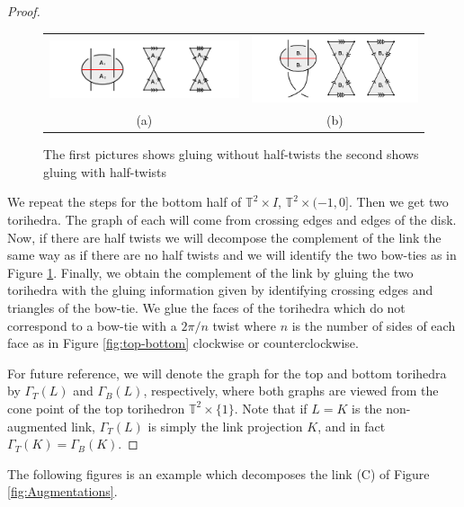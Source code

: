 \documentclass[11pt]{amsart}
\newcommand{\torus}{{\mathbb{T}^2}}
\theoremstyle{plain}
\theoremstyle{definition}
\begin{document}
\begin{proof}
\begin{figure}
 \centering
 \begin{tabular}{cc}
 \includegraphics [width=8cm]{falGluing1}&
 \includegraphics [width=7cm]{falGluing2}\\
 (a)&(b)
 \end{tabular}
 \caption{The first pictures shows gluing without half-twists the second shows gluing with half-twists}
 \label{fig:falGluings}
 \end{figure}

\indent We repeat the steps for the bottom half of $\torus \times I$, $\torus \times
(-1,0]$. Then we get two torihedra. The graph of each will come from
crossing edges and edges of the disk. Now, if there are half twists we will
decompose the complement of the link the same way as if there are no half twists
and we will identify the two bow-ties as in Figure \ref{fig:falGluings}.
Finally,
we obtain the complement of the link by gluing the two torihedra with the gluing
information given by identifying crossing edges and triangles of the bow-tie. We
glue the faces of the torihedra which do not correspond to a bow-tie with a
$2\pi/n$ twist where $n$ is the number of sides of each face as in Figure
\ref{fig:top-bottom} clockwise or counterclockwise.


For future reference, we will denote the graph for the top and bottom
torihedra by $\Gamma_T(L)$ and $\Gamma_B(L)$, respectively,
where both graphs are viewed from the cone point of the top torihedron
$\torus \times \{1\}$.
Note that if $L = K$ is the non-augmented link,
$\Gamma_T(L)$ is simply the link projection $K$,
and in fact $\Gamma_T(K) = \Gamma_B(K)$.

\end{proof}


The following figures is an example which decomposes the link (C) of Figure
\ref{fig:Augmentations}. 
\end{document}
